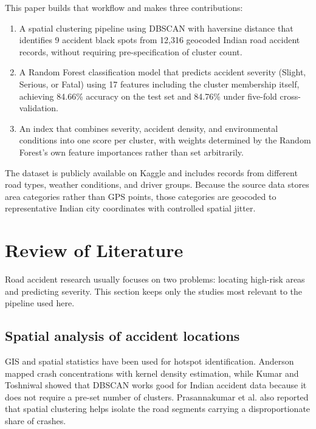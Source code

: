 \documentclass[conference]{IEEEtran}
\begin{document}
This paper builds that workflow and makes three contributions:

\begin{enumerate}
\item A spatial clustering pipeline using DBSCAN with haversine distance that identifies 9 accident black spots from 12,316 geocoded Indian road accident records, without requiring pre-specification of cluster count.

\item A Random Forest classification model that predicts accident severity (Slight, Serious, or Fatal) using 17 features including the cluster membership itself, achieving 84.66\% accuracy on the test set and 84.76\% under five-fold cross-validation.

\item An index that combines severity, accident density, and environmental conditions into one score per cluster, with weights determined by the Random Forest's own feature importances rather than set arbitrarily.
\end{enumerate}

The dataset is publicly available on Kaggle and includes records from different road types, weather conditions, and driver groups. Because the source data stores area categories rather than GPS points, those categories are geocoded to representative Indian city coordinates with controlled spatial jitter.

\section{Review of Literature}

Road accident research usually focuses on two problems: locating high-risk areas and predicting severity. This section keeps only the studies most relevant to the pipeline used here.

\subsection{Spatial analysis of accident locations}

GIS and spatial statistics have been used for hotspot identification. Anderson \cite{b4} mapped crash concentrations with kernel density estimation, while Kumar and Toshniwal \cite{b6} showed that DBSCAN works good for Indian accident data because it does not require a pre-set number of clusters. Prasannakumar et al. \cite{b8} also reported that spatial clustering helps isolate the road segments carrying a disproportionate share of crashes.
\end{document}
